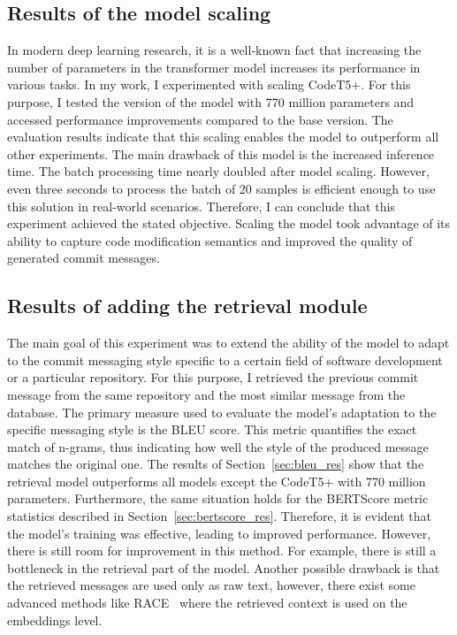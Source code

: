 \subsection{Results of the model scaling}
In modern deep learning research, it is a well-known fact that increasing the number of parameters in the transformer model increases its performance in various tasks. In my work, I experimented with scaling CodeT5+. For this purpose, I tested the version of the model with 770 million parameters and accessed performance improvements compared to the base version. 
The evaluation results indicate that this scaling enables the model to outperform all other experiments. The main drawback of this model is the increased inference time. The batch processing time nearly doubled after model scaling. However, even three seconds to process the batch of 20 samples is efficient enough to use this solution in real-world scenarios. Therefore, I can conclude that this experiment achieved the stated objective. Scaling the model took advantage of its ability to capture code modification semantics and improved the quality of generated commit messages. 


\subsection{Results of adding the retrieval module}
The main goal of this experiment was to extend the ability of the model to adapt to the commit messaging style specific to a certain field of software development or a particular repository. For this purpose, I retrieved the previous commit message from the same repository and the most similar message from the database. 
The primary measure used to evaluate the model's adaptation to the specific messaging style is the BLEU score. This metric quantifies the exact match of n-grams, thus indicating how well the style of the produced message matches the original one. 
The results of Section~\ref{sec:bleu_res} show that the retrieval model outperforms all models except the CodeT5+ with 770 million parameters. Furthermore, the same situation holds for the BERTScore metric statistics described in Section~\ref{sec:bertscore_res}. Therefore, it is evident that the model's training was effective, leading to improved performance. However, there is still room for improvement in this method. For example, there is still a bottleneck in the retrieval part of the model. Another possible drawback is that the retrieved messages are used only as raw text, however, there exist some advanced methods like RACE~\cite{shi2022race} where the retrieved context is used on the embeddings level.  

